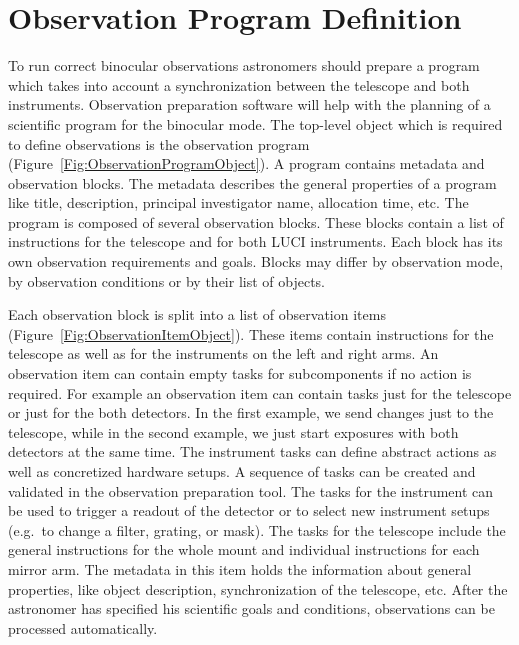 \section{Observation Program Definition}

To run correct binocular observations astronomers should prepare a program which takes into account a synchronization between the telescope and both instruments. Observation preparation software will help with the planning of a scientific program for the binocular mode. The top-level object which is required to define observations is the observation program (Figure~\ref{Fig:ObservationProgramObject}). A program contains metadata and observation blocks. The metadata describes the general properties of a program like title, description, principal investigator name, allocation time, etc. 
The program is composed of several observation blocks. These blocks contain a list of instructions for the telescope and for both LUCI instruments. Each block has its own observation requirements and goals. Blocks may differ by observation mode, by observation conditions or by their list of objects. 

Each observation block is split into a list of observation items (Figure~\ref{Fig:ObservationItemObject}). These items contain instructions for the telescope as well as for the instruments on the left and right arms. An observation item can contain empty tasks for subcomponents if no action is required. For example an observation item can contain tasks just for the telescope or just for the both detectors. In the first example, we send changes just to the telescope, while in the second example, we just start exposures with both detectors at the same time. The instrument tasks can define abstract actions as well as concretized hardware setups. A sequence of tasks can be created and validated in the observation preparation tool.  The tasks for the instrument can be used to trigger a readout of the detector or to select new instrument setups (e.g.\ to change a filter, grating, or mask). The tasks for the telescope include the general instructions for the whole mount and individual instructions for each mirror arm. The metadata in this item holds the information about general properties, like object description, synchronization of the telescope, etc. After the astronomer has specified his scientific goals and conditions, observations can be processed automatically.

